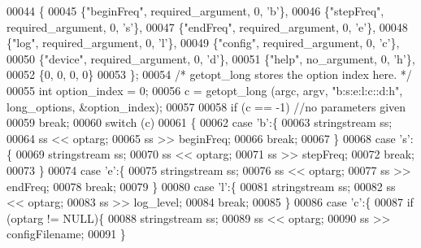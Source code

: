 \begin{DoxyCode}
00044         \{
00045             \{\textcolor{stringliteral}{"beginFreq"},   required_argument, 0, \textcolor{charliteral}{'b'}\},
00046             \{\textcolor{stringliteral}{"stepFreq"},    required_argument, 0, \textcolor{charliteral}{'s'}\},
00047             \{\textcolor{stringliteral}{"endFreq"},     required_argument, 0, \textcolor{charliteral}{'e'}\},
00048             \{\textcolor{stringliteral}{"log"},         required_argument, 0, \textcolor{charliteral}{'l'}\},
00049             \{\textcolor{stringliteral}{"config"},      required_argument, 0, \textcolor{charliteral}{'c'}\},
00050             \{\textcolor{stringliteral}{"device"},      required_argument, 0, \textcolor{charliteral}{'d'}\},
00051             \{\textcolor{stringliteral}{"help"},        no_argument, 0, \textcolor{charliteral}{'h'}\},
00052             \{0, 0, 0, 0\}
00053         \};
00054         \textcolor{comment}{/* getopt\_long stores the option index here. */}
00055         \textcolor{keywordtype}{int} option\_index = 0;
00056         c = getopt_long (argc, argv, \textcolor{stringliteral}{"b:s:e:l:c::d:h"}, long\_options, &option\_index);
00057 
00058         \textcolor{keywordflow}{if} (c == -1) \textcolor{comment}{//no parameters given}
00059             \textcolor{keywordflow}{break};
00060         \textcolor{keywordflow}{switch} (c)
00061         \{
00062         \textcolor{keywordflow}{case} \textcolor{charliteral}{'b'}:\{
00063             stringstream ss;
00064             ss << optarg;
00065             ss >> beginFreq;
00066             \textcolor{keywordflow}{break};
00067         \}
00068         \textcolor{keywordflow}{case} \textcolor{charliteral}{'s'}:\{
00069             stringstream ss;
00070             ss << optarg;
00071             ss >> stepFreq;
00072             \textcolor{keywordflow}{break};
00073         \}
00074         \textcolor{keywordflow}{case} \textcolor{charliteral}{'e'}:\{
00075             stringstream ss;
00076             ss << optarg;
00077             ss >> endFreq;
00078             \textcolor{keywordflow}{break};
00079         \}
00080         \textcolor{keywordflow}{case} \textcolor{charliteral}{'l'}:\{
00081             stringstream ss;
00082             ss << optarg;
00083             ss >> log_level;
00084             \textcolor{keywordflow}{break};
00085         \}
00086         \textcolor{keywordflow}{case} \textcolor{charliteral}{'c'}:\{
00087             \textcolor{keywordflow}{if} (optarg != NULL)\{
00088                 stringstream ss;
00089                 ss << optarg;
00090                 ss >> configFilename;
00091             \}

\end{DoxyCode}
